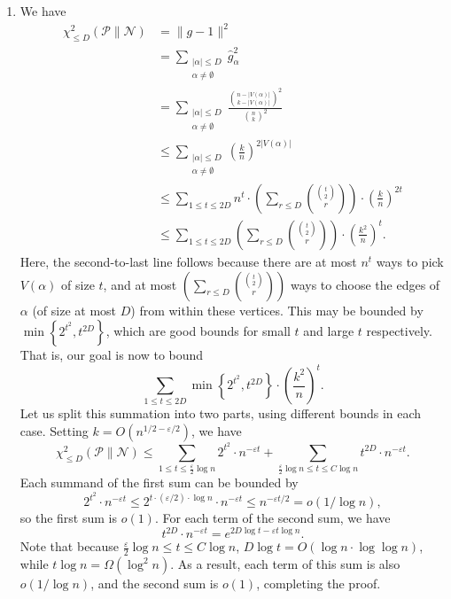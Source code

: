 \documentclass[11pt]{article}
\theoremstyle{definition}
\renewcommand{\epsilon}{\varepsilon}
\newcommand{\eps}{\epsilon}
\newcommand{\wh}[1]{\widehat{#1}}
\begin{document}
\begin{enumerate}[label=(\alph*)]
  \item We have
  \begin{align*}
    \chi^2_{\le D} \left( \mathcal{P} \| \mathcal{N} \right) &= \| g - 1 \|^2 \\
      &= \sum_{\substack{|\alpha| \le D \\ \alpha \ne \emptyset}} \wh{g}_\alpha^2 \\
      &= \sum_{\substack{|\alpha| \le D \\ \alpha \ne \emptyset}} \frac{\binom{n-|V(\alpha)|}{k-|V(\alpha)|}^2}{\binom{n}{k}^2} \\
      &\le \sum_{\substack{|\alpha| \le D \\ \alpha \ne \emptyset}} \left( \frac{k}{n} \right)^{2|V(\alpha)|} \\
      &\le \sum_{1 \le t \le 2D} n^t \cdot \left( \sum_{r \le D} \binom{ \binom{t}{2} }{ r } \right) \cdot \left( \frac{k}{n} \right)^{2t} \\
      &\le \sum_{1 \le t \le 2D} \left( \sum_{r \le D} \binom{ \binom{t}{2} }{ r } \right) \cdot \left( \frac{k^2}{n} \right)^t.
  \end{align*}
  Here, the second-to-last line follows because there are at most $n^t$ ways to pick $V(\alpha)$ of size $t$, and at most $\left( \sum_{r \le D} \binom{ \binom{t}{2} }{ r } \right)$ ways to choose the edges of $\alpha$ (of size at most $D$) from within these vertices. This may be bounded by $\min\left\{2^{t^2} , t^{2D}\right\}$, which are good bounds for small $t$ and large $t$ respectively. That is, our goal is now to bound
  \[ \sum_{1 \le t \le 2D} \min\left\{ 2^{t^2} , t^{2D} \right\} \cdot \left( \frac{k^2}{n} \right)^{t}. \]
  Let us split this summation into two parts, using different bounds in each case. Setting $k = O(n^{1/2-\eps/2})$, we have
  \[ \chi^2_{\le D}\left( \mathcal{P} \| \mathcal{N} \right) \le \sum_{1 \le t \le \frac{\eps}{2} \log n} 2^{t^2} \cdot n^{-\eps t} + \sum_{\frac{\eps}{2} \log n \le t \le C \log n} t^{2D} \cdot n^{-\eps t}. \]
  Each summand of the first sum can be bounded by
  \[ 2^{t^2} \cdot n^{-\eps t} \le 2^{t \cdot (\eps/2) \cdot \log n} \cdot n^{-\eps t} \le n^{-\eps t/2} = o(1/\log n), \]
  so the first sum is $o(1)$. For each term of the second sum, we have
  \[ t^{2D} \cdot n^{-\eps t} = e^{2D\log t - \eps t \log n}. \]
  Note that because $\frac{\eps}{2} \log n \le t \le C \log n$, $D \log t = O(\log n \cdot \log \log n)$, while $t \log n = \Omega(\log^2 n)$. As a result, each term of this sum is also $o(1/\log n)$, and the second sum is $o(1)$, completing the proof.
\end{enumerate}
\end{document}
